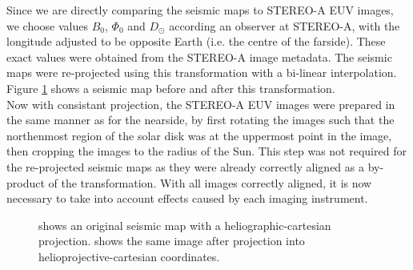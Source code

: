 \documentclass[11pt,a4paper,onecolumn]{report}
\begin{document}
Since we are directly comparing the seismic maps to STEREO-A EUV images, we
choose values \(B_0\), \(\Phi_0\) and \(D_\odot\) according an observer at STEREO-A,
with the longitude adjusted to be opposite Earth (i.e. the centre of the
farside). These exact values were obtained from the STEREO-A image metadata.
The seismic maps were re-projected using this transformation with a bi-linear
interpolation. Figure \ref{fig:projection} shows a seismic map before and after
this transformation. \\

Now with consistant projection, the STEREO-A EUV images were prepared in the
same manner as for the nearside, by first rotating the images such that the
northenmost region of the solar disk was at the uppermost point in the image,
then cropping the images to the radius of the Sun. This step was not required
for the re-projected seismic maps as they were already correctly aligned as a
by-product of the transformation. With all images correctly aligned, it
is now necessary to take into account effects caused by each imaging instrument.

\begin{figure}[t]%
  \centering
  \qquad

  \caption[]{ shows an original seismic map with a
  heliographic-cartesian projection.  shows the same
  image after projection into helioprojective-cartesian coordinates.}
  \label{fig:projection}
\end{figure}
\end{document}
